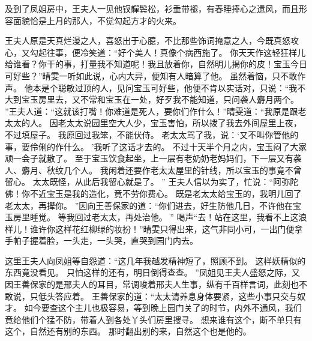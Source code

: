 及到了凤姐房中，王夫人一见他钗軃鬓松，衫垂带褪，有春睡捧心之遗风，而且形容面貌恰是上月的那人，不觉勾起方才的火来。
\par
王夫人原是天真烂漫之人，喜怒出于心臆，不比那些饰词掩意之人，今既真怒攻心，又勾起往事，便冷笑道：“好个美人！真像个病西施了。
你天天作这轻狂样儿给谁看？你干的事，打量我不知道呢！我且放着你，自然明儿揭你的皮！宝玉今日可好些？”晴雯一听如此说，心内大异，便知有人暗算了他。
虽然着恼，只不敢作声。
他本是个聪敏过顶的人，见问宝玉可好些，他便不肯以实话对，只说：“我不大到宝玉房里去，又不常和宝玉在一处，好歹我不能知道，只问袭人麝月两个。
”王夫人道：“这就该打嘴！你难道是死人，要你们作什么！”晴雯道：“我原是跟老太太的人。
因老太太说园里空大人少，宝玉害怕，所以拨了我去外间屋里上夜，不过填屋子。
我原回过我笨，不能伏侍。
老太太骂了我，说：‘又不叫你管他的事，要伶俐的作什么。
’我听了这话才去的。
不过十天半个月之内，宝玉闷了大家顽一会子就散了。
至于宝玉饮食起坐，上一层有老奶奶老妈妈们，下一层又有袭人、麝月、秋纹几个人。
我闲着还要作老太太屋里的针线，所以宝玉的事竟不曾留心。
太太既怪，从此后我留心就是了。
”
王夫人信以为实了，忙说：“阿弥陀佛！你不近宝玉是我的造化，竟不劳你费心。
既是老太太给宝玉的，我明儿回了老太太，再撵你。
”因向王善保家的道：“你们进去，好生防他几日，不许他在宝玉房里睡觉。
等我回过老太太，再处治他。
”
喝声“去！站在这里，我看不上这浪样儿！谁许你这样花红柳绿的妆扮！”晴雯只得出来，这气非同小可，一出门便拿手帕子握着脸，一头走，一头哭，直哭到园门内去。
\par
这里王夫人向凤姐等自怨道：“这几年我越发精神短了，照顾不到。
这样妖精似的东西竟没看见。
只怕这样的还有，明日倒得查查。
”凤姐见王夫人盛怒之际，又因王善保家的是邢夫人的耳目，常调唆着邢夫人生事，纵有千百样言词，此刻也不敢说，只低头答应着。
王善保家的道：“太太请养息身体要紧，这些小事只交与奴才。
如今要查这个主儿也极容易，等到晚上园门关了的时节，内外不通风，我们竟给他们个猛不防，带着人到各处丫头们房里搜寻。
想来谁有这个，断不单只有这个，自然还有别的东西。
那时翻出别的来，自然这个也是他的。
